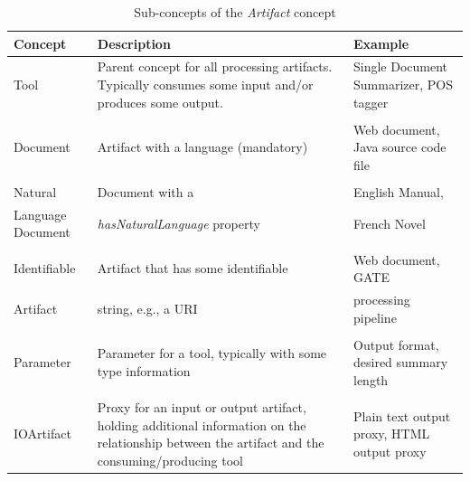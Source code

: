 \begin{table}[tb]
\centering\small\sffamily
\begin{tabular}{p{}@{\hspace*{4mm}}p{}@{\hspace*{4mm}}p{}}
  \toprule 
  \textbf{Concept}&\textbf{Description} &\textbf{Example} \\
  \midrule

  Tool & Parent concept for all processing artifacts. Typically
  consumes some input and/or produces some output. & Single Document
  Summarizer, POS tagger \\

   & & \\

  Document & Artifact with a language (mandatory) & Web document,
  Java source code file \\

   & & \\

  Natural & Document with a & English Manual, \\
  Language Document & \emph{hasNaturalLanguage} property & French Novel \\

   & & \\

  Identifiable & Artifact that has some identifiable & Web document, GATE \\
  Artifact & string, e.g., a URI & processing pipeline \\

   & & \\

  Parameter & Parameter for a tool, typically with some type
  information  & Output format, desired summary length \\

   & & \\

  IOArtifact & Proxy for an input or output artifact, holding
  additional information on the relationship between the artifact and
  the consuming/producing tool  & Plain text output proxy, HTML output
  proxy \\

  \bottomrule
\end{tabular}
\caption{Sub-concepts of the \emph{Artifact} concept}
\label{tab:artifact}
\end{table}




